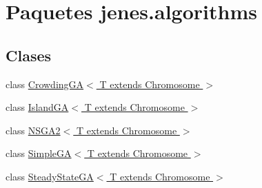 \hypertarget{namespacejenes_1_1algorithms}{\section{Paquetes jenes.\-algorithms}
\label{namespacejenes_1_1algorithms}
}
\subsection*{Clases}
\begin{DoxyCompactItemize}
\item 
class \hyperlink{classjenes_1_1algorithms_1_1_crowding_g_a_3_01_t_01extends_01_chromosome_01_4}{Crowding\-G\-A$<$ T extends Chromosome $>$}
\item 
class \hyperlink{classjenes_1_1algorithms_1_1_island_g_a_3_01_t_01extends_01_chromosome_01_4}{Island\-G\-A$<$ T extends Chromosome $>$}
\item 
class \hyperlink{classjenes_1_1algorithms_1_1_n_s_g_a2_3_01_t_01extends_01_chromosome_01_4}{N\-S\-G\-A2$<$ T extends Chromosome $>$}
\item 
class \hyperlink{classjenes_1_1algorithms_1_1_simple_g_a_3_01_t_01extends_01_chromosome_01_4}{Simple\-G\-A$<$ T extends Chromosome $>$}
\item 
class \hyperlink{classjenes_1_1algorithms_1_1_steady_state_g_a_3_01_t_01extends_01_chromosome_01_4}{Steady\-State\-G\-A$<$ T extends Chromosome $>$}
\end{DoxyCompactItemize}
